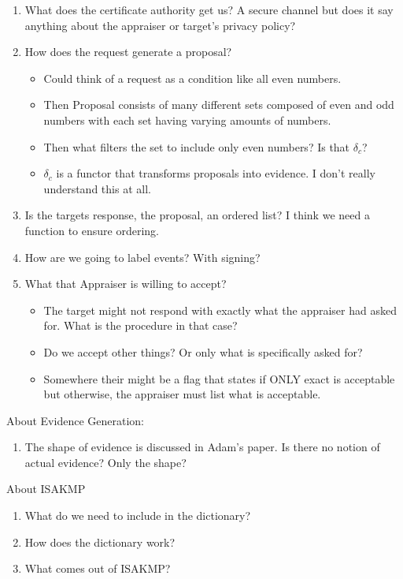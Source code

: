 \documentclass[10pt]{report}
\newcommand{\squash}{\itemsep=0pt\parskip=0pt}
\begin{document}
\begin{enumerate}
  \item What does the certificate authority get us? A secure channel but 
        does it say anything about the appraiser or target's
        privacy policy?
  \item How does the request generate a proposal? 
  \begin{itemize}
    \item Could think of a request as a condition like all even numbers.
    \item Then Proposal consists of many different sets composed of even
          and odd numbers with each set having varying amounts of numbers.
    \item Then what filters the set to include only even numbers?
          Is that $\delta_c$?
    \item $\delta_c$ is a functor that transforms proposals into evidence.
          I don't really understand this at all.  
  \end{itemize}
  \item Is the targets response, the proposal, an ordered list?
        I think we need a function to ensure ordering.
  \item How are we going to label events? With signing?
  \item What that Appraiser is willing to accept?
	\begin{itemize}
	\squash
	\item The target might not respond with exactly what the appraiser
          had asked for. What is the procedure in that case?
	\item Do we accept other things? Or only what is specifically asked for?
	\item Somewhere their might be a flag that states if ONLY exact is
          acceptable but otherwise, the appraiser must list what is acceptable. 
	\end{itemize}
\end{enumerate}

About Evidence Generation:

\begin{enumerate}
  \item The shape of evidence is discussed in Adam's paper. 
		Is there no notion of actual evidence? Only the shape?
\end{enumerate}

About ISAKMP

\begin{enumerate}
\item What do we need to include in the dictionary?
\item How does the dictionary work?
\item What comes out of ISAKMP?

\end{enumerate}
\end{document}

